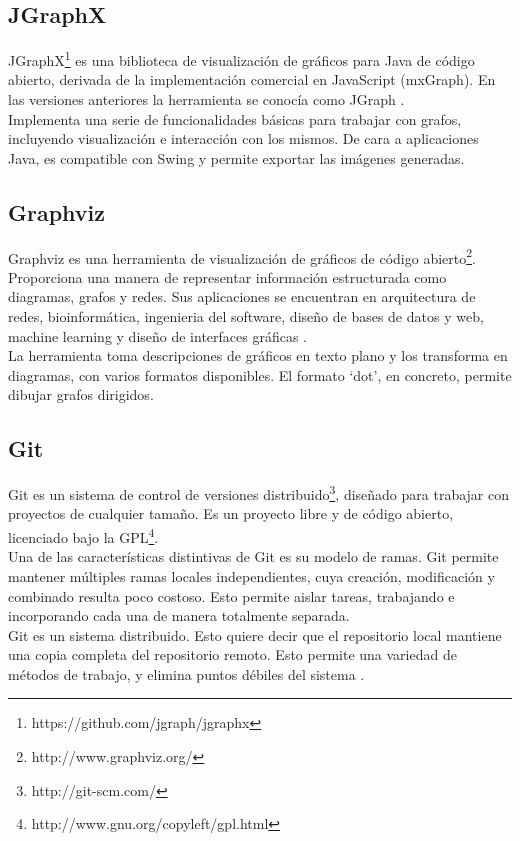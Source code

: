 \subsection{JGraphX}

JGraphX\footnote{https://github.com/jgraph/jgraphx} es una biblioteca de visualización de gráficos para Java de código abierto, derivada de la implementación comercial en JavaScript (mxGraph).
En las versiones anteriores la herramienta se conocía como JGraph \cite{website:jgraphx}.
\\
Implementa una serie de funcionalidades básicas para trabajar con grafos, incluyendo visualización e interacción con los mismos.
De cara a aplicaciones Java, es compatible con Swing y permite exportar las imágenes generadas.

\subsection{Graphviz}
Graphviz es una herramienta de visualización de gráficos de código abierto\footnote{http://www.graphviz.org/}.
Proporciona una manera de representar información estructurada como diagramas, grafos y redes.
Sus aplicaciones se encuentran en arquitectura de redes, bioinformática, ingenieria del software, diseño de bases de datos y web, machine learning y diseño de interfaces gráficas \cite{website:graphviz}.
\\
La herramienta toma descripciones de gráficos en texto plano y los transforma en diagramas, con varios formatos disponibles.
El formato `dot', en concreto, permite dibujar grafos dirigidos.

\subsection{Git}

Git es un sistema de control de versiones distribuido\footnote{http://git-scm.com/}, diseñado para trabajar con proyectos de cualquier tamaño.
Es un proyecto libre y de código abierto, licenciado bajo la GPL\footnote{http://www.gnu.org/copyleft/gpl.html}.
\\
Una de las características distintivas de Git es su modelo de ramas.
Git permite mantener múltiples ramas locales independientes, cuya creación, modificación y combinado resulta poco costoso.
Esto permite aislar tareas, trabajando e incorporando cada una de manera totalmente separada.
\\
Git es un sistema distribuido.
Esto quiere decir que el repositorio local mantiene una copia completa del repositorio remoto.
Esto permite una variedad de métodos de trabajo, y elimina puntos débiles del sistema \cite{website:git}.

